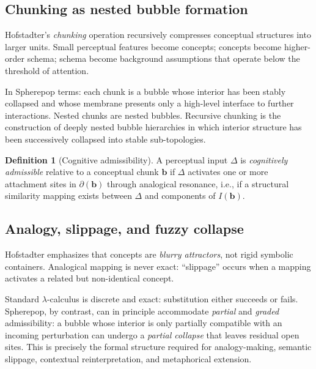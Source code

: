 \documentclass[12pt, a4paper]{article}
\theoremstyle{plain}
\theoremstyle{definition}
\newtheorem{definition}[theorem]{Definition}
\theoremstyle{remark}
\begin{document}
\subsection{Chunking as nested bubble formation}

Hofstadter's \emph{chunking} operation recursively compresses conceptual
structures into larger units.
Small perceptual features become concepts; concepts become
higher-order schema; schema become background assumptions that operate
below the threshold of attention.

In Spherepop terms: each chunk is a bubble whose interior has been
stably collapsed and whose membrane presents only a high-level
interface to further interactions.
Nested chunks are nested bubbles.
Recursive chunking is the construction of deeply nested bubble hierarchies
in which interior structure has been successively collapsed into stable
sub-topologies.

\begin{definition}[Cognitive admissibility]
  A perceptual input $\Delta$ is \emph{cognitively admissible}
  relative to a conceptual chunk $\mathbf{b}$ if $\Delta$ activates
  one or more attachment sites in $\partial(\mathbf{b})$ through
  analogical resonance, i.e., if a structural similarity mapping
  exists between $\Delta$ and components of $I(\mathbf{b})$.
\end{definition}

\subsection{Analogy, slippage, and fuzzy collapse}

Hofstadter emphasizes that concepts are \emph{blurry attractors},
not rigid symbolic containers.
Analogical mapping is never exact: ``slippage'' occurs when a mapping
activates a related but non-identical concept.

Standard $\lambda$-calculus is discrete and exact: substitution
either succeeds or fails.
Spherepop, by contrast, can in principle accommodate \emph{partial}
and \emph{graded} admissibility: a bubble whose interior is only
partially compatible with an incoming perturbation can undergo
a \emph{partial collapse} that leaves residual open sites.
This is precisely the formal structure required for
analogy-making, semantic slippage, contextual reinterpretation,
and metaphorical extension.
\end{document}
